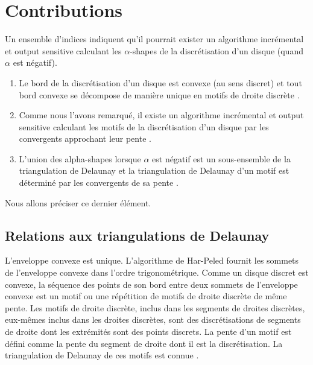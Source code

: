 \section{Contributions}

Un ensemble d'indices indiquent qu'il pourrait exister un algorithme incrémental et output sensitive calculant les $\alpha$-shapes de la discrétisation d'un disque (quand $\alpha$ est négatif). 

\begin{enumerate}
\item Le bord de la discrétisation d'un disque est convexe (au sens discret) et tout bord convexe se décompose de manière unique en motifs de droite discrète \cite{roussillonPR2011}. 
\item Comme nous l'avons remarqué, il existe un algorithme incrémental et output sensitive calculant les motifs de la discrétisation d'un disque par les convergents approchant leur pente \cite{HarPeled98}. 
\item L'union des alpha-shapes lorsque $\alpha$ est négatif est un sous-ensemble de la triangulation de Delaunay \cite{EdeKirSei83}et la triangulation de Delaunay d'un motif est déterminé par les convergents de sa pente \cite{RoussillonL11}. 
\end{enumerate}

Nous allons préciser ce dernier élément. 

\subsection{Relations aux triangulations de Delaunay}


L'enveloppe convexe est unique. L'algorithme de Har-Peled fournit les sommets de l'enveloppe convexe dans l'ordre trigonométrique. Comme un disque discret est convexe, la séquence des points de son bord entre deux sommets de l'enveloppe convexe est un motif ou une répétition de motifs de droite discrète de même pente. Les motifs de droite discrète, inclus dans les segments de droites discrètes, eux-mêmes inclus dans les droites discrètes, sont des discrétisations de segments de droite dont les extrémités sont des points discrets. La pente d'un motif est défini comme la pente du segment de droite dont il est la discrétisation. La triangulation de Delaunay de ces motifs est connue \cite{RoussillonL11}.\\

